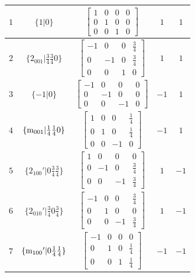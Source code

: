 \documentclass[fleqn,8pt]{jsarticle}
\begin{document}
\begin{longtable}{ccccc}
$ 1 $ & $ \{1|0\} $ & $ \begin{bmatrix} 1 & 0 & 0 & 0 \\ 0 & 1 & 0 & 0 \\ 0 & 0 & 1 & 0 \end{bmatrix} $ & $ 1 $ & $ 1 $ \\ \hline
$ 2 $ & $ \{2{}_{001}|\frac{3}{4} \frac{3}{4} 0\} $ & $ \begin{bmatrix} -1 & 0 & 0 & \frac{3}{4} \\ 0 & -1 & 0 & \frac{3}{4} \\ 0 & 0 & 1 & 0 \end{bmatrix} $ & $ 1 $ & $ 1 $ \\ \hline
$ 3 $ & $ \{-1|0\} $ & $ \begin{bmatrix} -1 & 0 & 0 & 0 \\ 0 & -1 & 0 & 0 \\ 0 & 0 & -1 & 0 \end{bmatrix} $ & $ -1 $ & $ 1 $ \\ \hline
$ 4 $ & $ \{{\rm m}_{001}|\frac{1}{4} \frac{1}{4} 0\} $ & $ \begin{bmatrix} 1 & 0 & 0 & \frac{1}{4} \\ 0 & 1 & 0 & \frac{1}{4} \\ 0 & 0 & -1 & 0 \end{bmatrix} $ & $ -1 $ & $ 1 $ \\ \hline
$ 5 $ & $ \{2{}_{100}{}'|0 \frac{3}{4} \frac{3}{4}\} $ & $ \begin{bmatrix} 1 & 0 & 0 & 0 \\ 0 & -1 & 0 & \frac{3}{4} \\ 0 & 0 & -1 & \frac{3}{4} \end{bmatrix} $ & $ 1 $ & $ -1 $ \\ \hline
$ 6 $ & $ \{2{}_{010}{}'|\frac{3}{4} 0 \frac{3}{4}\} $ & $ \begin{bmatrix} -1 & 0 & 0 & \frac{3}{4} \\ 0 & 1 & 0 & 0 \\ 0 & 0 & -1 & \frac{3}{4} \end{bmatrix} $ & $ 1 $ & $ -1 $ \\ \hline
$ 7 $ & $ \{{\rm m}_{100}{}'|0 \frac{1}{4} \frac{1}{4}\} $ & $ \begin{bmatrix} -1 & 0 & 0 & 0 \\ 0 & 1 & 0 & \frac{1}{4} \\ 0 & 0 & 1 & \frac{1}{4} \end{bmatrix} $ & $ -1 $ & $ -1 $ \\ \hline

\end{longtable}
\end{document}
